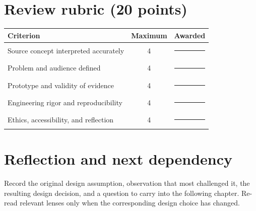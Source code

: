 \documentclass[11pt]{article}
\begin{document}
\section{Review rubric (20 points)}
\begin{tabularx}{\linewidth}{@{}Xcc@{}}\toprule
Criterion & Maximum & Awarded \\ \midrule
Source concept interpreted accurately & 4 & \rule{0.45in}{0.4pt}\\
Problem and audience defined & 4 & \rule{0.45in}{0.4pt}\\
Prototype and validity of evidence & 4 & \rule{0.45in}{0.4pt}\\
Engineering rigor and reproducibility & 4 & \rule{0.45in}{0.4pt}\\
Ethics, accessibility, and reflection & 4 & \rule{0.45in}{0.4pt}\\\bottomrule
\end{tabularx}

\section{Reflection and next dependency}
Record the original design assumption, observation that most challenged it, the resulting design decision, and a question to carry into the following chapter. Re-read relevant lenses only when the corresponding design choice has changed.
\end{document}
